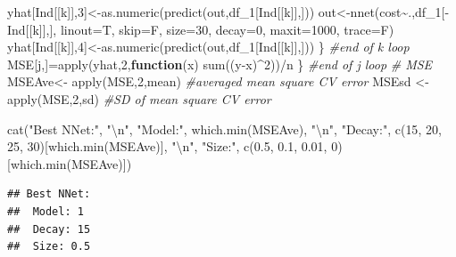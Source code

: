 \documentclass[
]{article}
\newenvironment{Shaded}{\begin{snugshade}}{\end{snugshade}}
\newcommand{\AttributeTok}[1]{\textcolor[rgb]{0.77,0.63,0.00}{#1}}
\newcommand{\CommentTok}[1]{\textcolor[rgb]{0.56,0.35,0.01}{\textit{#1}}}
\newcommand{\ControlFlowTok}[1]{\textcolor[rgb]{0.13,0.29,0.53}{\textbf{#1}}}
\newcommand{\DecValTok}[1]{\textcolor[rgb]{0.00,0.00,0.81}{#1}}
\newcommand{\FloatTok}[1]{\textcolor[rgb]{0.00,0.00,0.81}{#1}}
\newcommand{\FunctionTok}[1]{\textcolor[rgb]{0.00,0.00,0.00}{#1}}
\newcommand{\NormalTok}[1]{#1}
\newcommand{\OtherTok}[1]{\textcolor[rgb]{0.56,0.35,0.01}{#1}}
\newcommand{\SpecialCharTok}[1]{\textcolor[rgb]{0.00,0.00,0.00}{#1}}
\newcommand{\StringTok}[1]{\textcolor[rgb]{0.31,0.60,0.02}{#1}}
\begin{document}
\begin{Shaded}
\begin{Highlighting}[]
\NormalTok{    yhat[Ind[[k]],}\DecValTok{3}\NormalTok{]}\OtherTok{\textless{}{-}}\FunctionTok{as.numeric}\NormalTok{(}\FunctionTok{predict}\NormalTok{(out,df\_1[Ind[[k]],]))}
\NormalTok{    out}\OtherTok{\textless{}{-}}\FunctionTok{nnet}\NormalTok{(cost}\SpecialCharTok{\textasciitilde{}}\NormalTok{.,df\_1[}\SpecialCharTok{{-}}\NormalTok{Ind[[k]],], }\AttributeTok{linout=}\NormalTok{T, }\AttributeTok{skip=}\NormalTok{F, }\AttributeTok{size=}\DecValTok{30}\NormalTok{, }\AttributeTok{decay=}\DecValTok{0}\NormalTok{, }\AttributeTok{maxit=}\DecValTok{1000}\NormalTok{, }\AttributeTok{trace=}\NormalTok{F)}
\NormalTok{    yhat[Ind[[k]],}\DecValTok{4}\NormalTok{]}\OtherTok{\textless{}{-}}\FunctionTok{as.numeric}\NormalTok{(}\FunctionTok{predict}\NormalTok{(out,df\_1[Ind[[k]],]))}
\NormalTok{  \} }\CommentTok{\#end of k loop}
\NormalTok{  MSE[j,]}\OtherTok{=}\FunctionTok{apply}\NormalTok{(yhat,}\DecValTok{2}\NormalTok{,}\ControlFlowTok{function}\NormalTok{(x) }\FunctionTok{sum}\NormalTok{((y}\SpecialCharTok{{-}}\NormalTok{x)}\SpecialCharTok{\^{}}\DecValTok{2}\NormalTok{))}\SpecialCharTok{/}\NormalTok{n}
\NormalTok{\} }\CommentTok{\#end of j loop}
\CommentTok{\# MSE}
\NormalTok{MSEAve}\OtherTok{\textless{}{-}} \FunctionTok{apply}\NormalTok{(MSE,}\DecValTok{2}\NormalTok{,mean) }\CommentTok{\#averaged mean square CV error}
\NormalTok{MSEsd }\OtherTok{\textless{}{-}} \FunctionTok{apply}\NormalTok{(MSE,}\DecValTok{2}\NormalTok{,sd)  }\CommentTok{\#SD of mean square CV error}

\FunctionTok{cat}\NormalTok{(}\StringTok{"Best NNet:"}\NormalTok{, }\StringTok{"}\SpecialCharTok{\textbackslash{}n}\StringTok{"}\NormalTok{, }\StringTok{"Model:"}\NormalTok{, }\FunctionTok{which.min}\NormalTok{(MSEAve), }\StringTok{"}\SpecialCharTok{\textbackslash{}n}\StringTok{"}\NormalTok{, }
    \StringTok{"Decay:"}\NormalTok{, }\FunctionTok{c}\NormalTok{(}\DecValTok{15}\NormalTok{, }\DecValTok{20}\NormalTok{, }\DecValTok{25}\NormalTok{, }\DecValTok{30}\NormalTok{)[}\FunctionTok{which.min}\NormalTok{(MSEAve)], }\StringTok{"}\SpecialCharTok{\textbackslash{}n}\StringTok{"}\NormalTok{, }
    \StringTok{"Size:"}\NormalTok{, }\FunctionTok{c}\NormalTok{(}\FloatTok{0.5}\NormalTok{, }\FloatTok{0.1}\NormalTok{, }\FloatTok{0.01}\NormalTok{, }\DecValTok{0}\NormalTok{)[}\FunctionTok{which.min}\NormalTok{(MSEAve)])}
\end{Highlighting}
\end{Shaded}

\begin{verbatim}
## Best NNet: 
##  Model: 1 
##  Decay: 15 
##  Size: 0.5
\end{verbatim}
\end{document}
